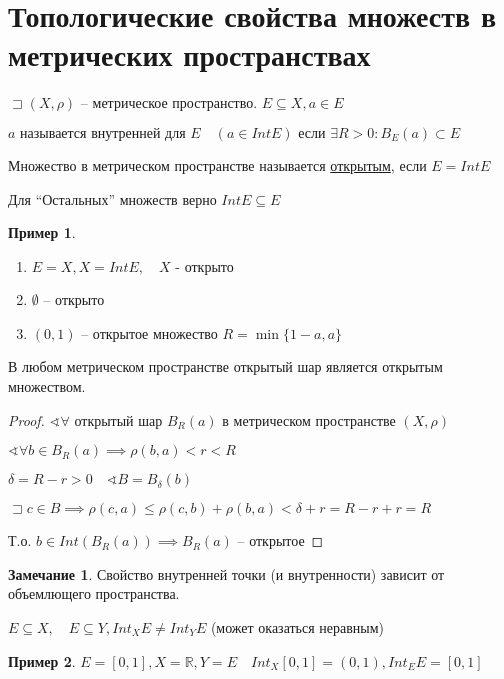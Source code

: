 \documentclass{book}
\newcommand\R{\ensuremath{\mathbb{R}}}
\renewcommand\O{\ensuremath{\emptyset}}
\theoremstyle{definition}
\newtheorem*{note}{Замечание}
\newtheorem*{example}{Пример}
\begin{document}
\section{Топологические свойства множеств в метрических пространствах}

\begin{definition}
    $\sqsupset \left( X, \rho \right) $ -- метрическое пространство. $E\subseteq X, a\in E$

   $ 
        a \text{ называется внутренней для } E\quad (a\in Int E) \text{ если } \exists R>0: B_E(a) \subset E
    $ 
\end{definition}

\begin{definition}
    Множество в метрическом пространстве называется \underline{открытым}, если $ E = Int E$

    Для ``Остальных'' множеств верно $Int E \subseteq E$
\end{definition}
\begin{example}
    \begin{enumerate}
        \item $E = X, X = Int E,\quad X$ - открыто
        \item $\O $ -- открыто
        \item $(0,1)$ -- открытое множество $ R = \min \{1-a, a\}$
    \end{enumerate}
\end{example}

\begin{statement}
    В любом метрическом пространстве открытый шар является открытым множеством.
\end{statement}
\begin{proof}
    $\sphericalangle \forall $ открытый шар $B_R(a)$ в метрическом пространстве  $(X, \rho)$

    $\sphericalangle \forall b\in B_R(a) \implies  \rho(b,a)<r<R$

    $\delta = R-r>0\quad \sphericalangle B = B_{\delta}(b)$

    $\sqsupset c\in B \implies  \rho(c,a) \leqslant \rho(c,b) + \rho(b,a) < \delta + r = R-r +r = R$

    Т.о. $b\in Int(B_R(a)) \implies  B_R(a)$ -- открытое
\end{proof}

\begin{note}
    Свойство внутренней точки (и внутренности) зависит от объемлющего пространства. 

    $ E\subseteq X,\quad E\subseteq Y, Int_X E \neq Int_Y E$ (может оказаться неравным)
\end{note}
\begin{example}
    $E = [0,1], X=\R, Y = E\quad Int_X [0,1] = (0,1), Int_E E = [0,1]$
\end{example}
\end{document}
